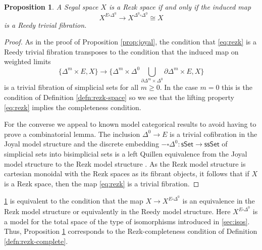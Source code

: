 \documentclass[12pt]{amsart}
\theoremstyle{plain}
\newtheorem{prop}[thm]{Proposition}
\theoremstyle{definition}
\theoremstyle{remark}
\numberwithin{equation}{section}
\newcommand{\sSet}{\mathsf{sSet}}
\newcommand{\ssSet}{\mathsf{ssSet}}
\begin{document}
\begin{prop}\label{prop:rezk-space} A Segal space $X$ is a Rezk space if and only if the induced map
\begin{equation}\label{eq:rezk} X^{E \square \Delta^0} \to X^{\Delta^0 \square \Delta^0} \cong X
\end{equation}
is a Reedy trivial fibration.
\end{prop}
\begin{proof}
As in the proof of Proposition \ref{prop:joyal}, the condition that \eqref{eq:rezk} is a Reedy trivial fibration
transposes to the condition that  the induced map on weighted limits
\[ \{ \Delta^m \times E, X\} \to \{ \Delta^m \times \Delta^0 \bigcup\limits_{\partial\Delta^m\times \Delta^0} \partial\Delta^m \times E, X\}\] is a trivial fibration of simplicial sets for all $m \geq 0$. In the case $m=0$ this is the condition of Definition \ref{defn:rezk-space} so we see that the lifting property \eqref{eq:rezk} implies the completeness condition.

For the converse we appeal to known model categorical results to avoid having to prove a combinatorial lemma. The inclusion $\Delta^0 \to E$ is a trivial cofibration in the Joyal model structure and the discrete embedding $-\square\Delta^0 \colon \sSet \to \ssSet$ of simplicial sets into bisimplicial sets is a left Quillen equivalence from the Joyal model structure to the Rezk model structure \cite[4.11]{JT}. As the Rezk model structure is cartesian monoidal with the Rezk spaces as its fibrant objects, it follows that if $X$ is a Rezk space, then the map \eqref{eq:rezk} is a trivial fibration.
\end{proof}


\cref{prop:rezk-space} is equivalent to the condition that the map $X \to X^{E \square\Delta^0}$ is an equivalence in the Rezk model structure or equivalently in the Reedy model structure. Here $X^{E\square\Delta^0}$ is a model for the total space of the type of isomorphisms introduced in \cref{sec:isos}. Thus, Proposition \ref{prop:rezk-space} corresponds to the Rezk-completeness condition of Definition \ref{defn:rezk-complete}.
\end{document}
